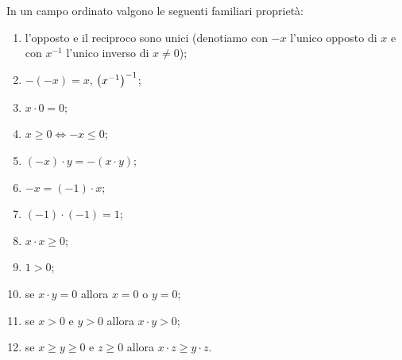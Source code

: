 \begin{theorem}
In un campo ordinato
valgono le seguenti
familiari proprietà:
\begin{enumerate}
  \item l'opposto e il reciproco sono unici
  (denotiamo con $-x$ l'unico opposto di $x$ e con $x^{-1}$ l'unico inverso di $x\neq 0$);
  \item $-(-x) = x$, ${\left( x^{-1} \right)}^{-1}$;
  \item $x \cdot 0 = 0$;
  \item $x\ge 0 \iff -x \le 0$;
  \item $(-x)\cdot y = -(x\cdot y)$;
  \item $-x = (-1)\cdot x$;
  \item $(-1)\cdot(-1) = 1$;
  \item $x\cdot x \ge 0$;
  \item $1 > 0$;
  \item se $x\cdot y = 0$ allora $x = 0$ o $y = 0$;
  \item se $x>0$ e $y>0$  allora $x\cdot y > 0$;
  \item se $x\ge y\ge 0$ e $z\ge 0$ allora $x\cdot z \ge y \cdot z$.
\end{enumerate}
\end{theorem}
%

